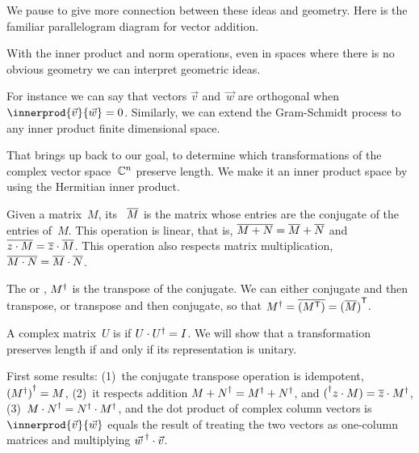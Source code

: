 We pause to give more connection between these ideas and geometry.
Here is the familiar parallelogram diagram for vector addition. 





With the inner product and norm operations, 
even in spaces where there is no obvious geometry
we can interpret geometric ideas. 









For instance we can say that
vectors $\vec{v}$ and~$\vec{w}$ are orthogonal when 
$\innerprod{\vec{v}}{\vec{w}}=0$.
Similarly, we can extend the Gram-Schmidt process
to any inner product finite dimensional space.

That brings up back to our goal, to determine which transformations
of the complex vector space~$\mathbb{C}^n$ preserve length.
We make it an inner product space by using the Hermitian inner product.

Given a matrix~$M$, its ~$\overline{M}$ is 
the matrix whose entries are the conjugate of the entries of~$M$.
This operation is linear, that is, 
$\overline{M+N}=\overline{M}+\overline{N}$ and 
$\overline{z\cdot M}=\overline{z}\cdot\overline{M}$.
This operation also respects matrix multiplication, 
$\overline{M\cdot N}=\overline{M}\cdot\overline{N}$.  

The  or ,
${M}^{\dagger}$
is the transpose of the conjugate.
We can either conjugate and then transpose, or transpose and 
then conjugate, so that
${M}^{\dagger}=\overline{({{M}^{\mathsf{T}}})}={{(\overline{M})}^{\mathsf{T}}}$.

A complex matrix~$U$ is  if $U\cdot{U}^{\dagger}=I$.
We will show that a transformation preserves length if and only if its
representation is unitary.

First some results:
(1)~the conjugate transpose operation is idempotent, 
${({M}^{\dagger})}^{\dagger}=M$,
(2)~it respects addition ${M+N}^{\dagger}={M}^{\dagger}+{N}^{\dagger}$,
and ${(}^{\dagger}z\cdot M)=\overline{z}\cdot{M}^{\dagger}$,
(3)~${M\cdot N}^{\dagger}={N}^{\dagger}\cdot{M}^{\dagger}$,
and the dot product of complex column vectors is 
$\innerprod{\vec{v}}{\vec{w}}$ equals the 
result of treating the two vectors as one-column matrices and 
multiplying ${\vec{w}\,}^{\dagger}\cdot \vec{v}$.

